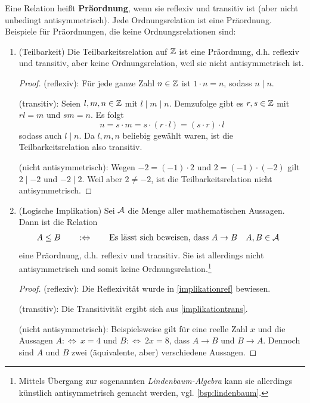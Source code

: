 \begin{bsp}[Präordnungen] 
    Eine Relation heißt \textbf{Präordnung}, wenn sie reflexiv und transitiv ist (aber nicht unbedingt antisymmetrisch). Jede Ordnungsrelation ist eine Präordnung. Beispiele für Präordnungen, die keine Ordnungsrelationen sind:
    \begin{enumerate}
        \item(Teilbarkeit) Die Teilbarkeitsrelation auf $\mathbb Z$ ist eine Präordnung, d.h. reflexiv und transitiv, aber keine Ordnungsrelation, weil sie nicht antisymmetrisch ist.
        \begin{proof}
            (reflexiv): Für jede ganze Zahl $n\in \mathbb Z$ ist $1\cdot n=n$, sodass $n\mid n$.

            (transitiv): Seien $l,m,n\in \mathbb Z$ mit $l\mid m\mid n$. Demzufolge gibt es $r,s\in \mathbb Z$ mit $rl=m$ und $sm=n$. Es folgt
                \[ n = s\cdot m = s\cdot (r\cdot l) = (s\cdot r)\cdot l \]
            sodass auch $l\mid n$. Da $l,m,n$ beliebig gewählt waren, ist die Teilbarkeitsrelation also transitiv.

            (nicht antisymmetrisch): Wegen $-2=(-1)\cdot 2$ und $2=(-1)\cdot (-2)$ gilt $2\mid -2$ und $-2\mid 2$. Weil aber $2\neq -2$, ist die Teilbarkeitsrelation nicht antisymmetrisch.
        \end{proof}
        \item(Logische Implikation) Sei $\mathcal A$ die Menge aller mathematischen Aussagen. Dann ist die Relation
        \begin{align*}
            A\le B \qquad &:\Leftrightarrow\qquad  \text{Es lässt sich beweisen, dass $A\to B$} && A,B\in \mathcal A
        \end{align*}
        eine Präordnung, d.h. reflexiv und transitiv. Sie ist allerdings nicht antisymmetrisch und somit keine Ordnungsrelation.\footnote{Mittels Übergang zur sogenannten \emph{Lindenbaum-Algebra} kann sie allerdings künstlich antisymmetrisch gemacht werden, vgl. \cref{bsp:lindenbaum}.}
        \begin{proof}
            (reflexiv): Die Reflexivität wurde in \cref{implikationref} bewiesen.

            (transitiv): Die Transitivität ergibt sich aus \cref{implikationtrans}.

            (nicht antisymmetrisch): Beispielsweise gilt für eine reelle Zahl $x$ und die Aussagen $A:\Leftrightarrow\ x=4$ und $B:\Leftrightarrow\ 2x=8$, dass $A\to B$ und $B\to A$. Dennoch sind $A$ und $B$ zwei (äquivalente, aber) verschiedene Aussagen.
        \end{proof}
    \end{enumerate}
\end{bsp}


